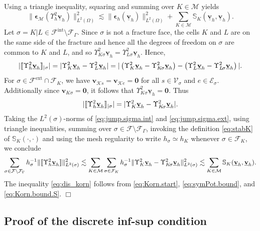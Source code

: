 \documentclass[a4paper,11pt]{article}
\theoremstyle{definition}
\theoremstyle{remark}
\newcommand{\norm}[2]{\|#2\|_{#1}}
\newcommand{\uvec}[1]{\underline{\mathbf{#1}}}
\newcommand{\bo}[1]{\mathbf{#1}}
\newcommand{\up}[1]{\Upsilon^2_{#1}}
\def\ext{\text{ext}}
\def\inte{\text{int}}
\def\be{\boldsymbol{\epsilon}}
\def\cE{\mathcal{E}}
\def\cF{\mathcal{F}}
\def\cM{\mathcal{M}}
\def\cV{\mathcal{V}}
\def\sjump#1{[\hskip -1.5pt[#1]\hskip -1.5pt]}
\newcommand{\Ks}{{\mathcal{K}s}}
\newcommand{\Ke}{{\mathcal{K}e}}
\def\Ksig{{K\!\sigma}}
\def\Lsig{{L\!\sigma}}
\def\Lsig{{L\!\sigma}}
\begin{document}
Using a triangle inequality, squaring and summing over $K\in\cM$ yields
\begin{equation}\label{eq:symPot.bound}
\norm{L^2(\Omega)}{\be_\cM(\up{h}\uvec{v}_h)}^2\lesssim \norm{L^2(\Omega)}{\be_h(\uvec{v}_h)}^2+
\sum_{K\in\cM}\mathbb S_K(\uvec{v}_h,\uvec{v}_h).
\end{equation}
Let $\sigma=K|L\in\cF^\inte\setminus\cF_\Gamma$. Since $\sigma$ is not a fracture face, the cells $K$ and $L$ are on the same side of the fracture and hence all the degrees of freedom on $\sigma$ are common to $K$ and $L$, and so $\up{\Ksig}\uvec{v}_h=\up{\Lsig}\uvec{v}_h$. Hence, 
\begin{equation}\label{eq:jump.sigma.int}
|\sjump{\up{h}\uvec{v}_h}_{|\sigma}|=|\up{K}\uvec{v}_h-\up{L}\uvec{v}_h|
=|\left(\up{K}\uvec{v}_h-\up{\Ksig}\uvec{v}_h\right)-\left(\up{L}\uvec{v}_h-\up{\Lsig}\uvec{v}_h\right)|.
\end{equation}
For $\sigma\in\cF^\ext\cap\cF_K$, we have  $\bo{v}_{\Ks}=\bo{v}_{\Ke}=\bo{0}$ for all $s\in\cV_\sigma$ and $e\in\cE_\sigma$. Additionally since $\bo{v}_{\Ksig}=\bo{0}$, it follows that $\up{\Ksig}\uvec{v}_h=\bo{0}.$ Thus
\begin{equation}\label{eq:jump.sigma.ext}
|\sjump{\up{h}\uvec{v}_h}_{|\sigma}|=|\up{K}\uvec{v}_h-\up{\Ksig}\uvec{v}_h|.
\end{equation}
Taking the $L^2(\sigma)$-norms of \eqref{eq:jump.sigma.int} and \eqref{eq:jump.sigma.ext}, using triangle inequalities, summing over $\sigma\in\cF\setminus\cF_\Gamma$, invoking the definition \eqref{eq:stabK} of $\mathbb S_K(\cdot,\cdot)$ and using the mesh
regularity to write $h_\sigma\simeq h_K$ whenever $\sigma\in\cF_K$, we conclude
\begin{equation}\label{eq:Korn.bound.S}
\sum_{\sigma\in\cF\setminus\cF_\Gamma}h^{-1}_\sigma\lVert \sjump{\up{h}\uvec{v}_h}\rVert_{L^2(\sigma)}^2\lesssim \sum_{K\in\cM}\sum_{\sigma\in\cF_K}h^{-1}_{\sigma}\lVert \up{K}\uvec{v}_h-\up{\Ksig}\uvec{v}_h\rVert^2_{L^2(\sigma)}
\lesssim\sum_{K\in\cM}\mathbb S_K(\uvec{v}_h,\uvec{v}_h).
\end{equation}
The inequality \eqref{eq:dis_korn} follows from \eqref{eq:Korn.start}, \eqref{eq:symPot.bound}, and \eqref{eq:Korn.bound.S}. \hfill $\Box$

\subsection{Proof of the discrete inf-sup condition}\label{sec:Inf-sup}
\end{document}
